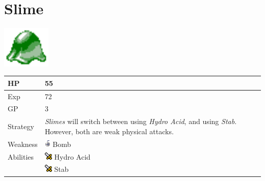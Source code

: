 \section{Slime}
\label{monster:slime}

\includegraphics[height=2cm,keepaspectratio]{./resources/monster/slime}

\begin{longtable}{ l p{9cm} }
	HP
	& 55
\\ \hline
	Exp
	& 72
\\ \hline
	GP
	& 3
\\ \hline
	Strategy
	& \textit{Slimes} will switch between using \textit{Hydro Acid}, and using \textit{Stab}. However, both are weak physical attacks.
\\ \hline
	Weakness
	& \includegraphics[height=1em,keepaspectratio]{./resources/effects/bomb} Bomb
\\ \hline
	Abilities
	& \includegraphics[height=1em,keepaspectratio]{./resources/effects/damage} Hydro Acid \\
	& \includegraphics[height=1em,keepaspectratio]{./resources/effects/damage} Stab
\end{longtable}
